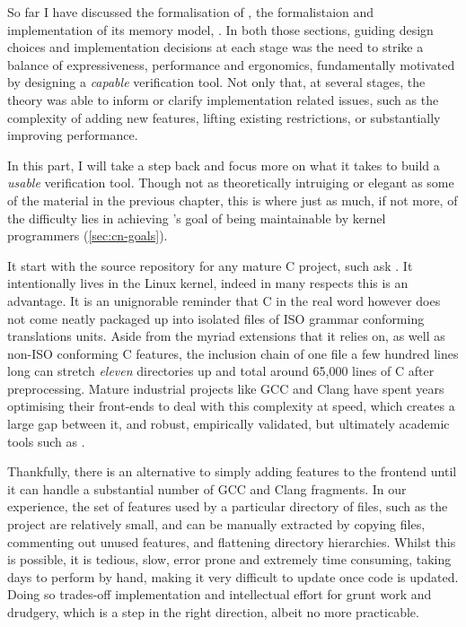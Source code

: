 So far I have discussed the formalisation of , the formalistaion and
implementation of its memory model, . In both those sections,
guiding design choices and implementation decisions at each stage was the need
to strike a balance of expressiveness, performance and ergonomics,
fundamentally motivated by designing a \emph{capable} verification tool. Not
only that, at several stages, the theory was able to inform or clarify
implementation related issues, such as the complexity of adding new features,
lifting existing restrictions, or substantially improving performance.

In this part, I will take a step back and focus more on what it takes to build
a \emph{usable} verification tool. Though not as theoretically intruiging or
elegant as some of the material in the previous chapter, this is where just as
much, if not more, of the difficulty lies in achieving 's goal of being
maintainable by kernel programmers (\cref{sec:cn-goals}).

It start with the source repository for any mature C project, such ask
. It intentionally lives in the Linux kernel, indeed in many respects
this is an advantage. It is an unignorable reminder that C in the real word
however does not come neatly packaged up into isolated files of ISO grammar
conforming translations units. Aside from the myriad extensions that it relies
on, as well as non-ISO conforming C features, the inclusion chain of one file a
few hundred lines long can stretch \emph{eleven} directories up and total
around 65,000 lines of C after preprocessing. Mature industrial projects like
GCC and Clang have spent years optimising their front-ends to deal with this
complexity at speed, which creates a large gap between it, and robust,
empirically validated, but ultimately academic tools such as .

Thankfully, there is an alternative to simply adding features to the
 frontend until it can handle a substantial number of GCC and
Clang fragments. In our experience, the set of features used by a particular
directory of files, such as the  project are relatively small, and can
be manually extracted by copying files, commenting out unused features, and
flattening directory hierarchies. Whilst this is possible, it is tedious, slow,
error prone and extremely time consuming, taking days to perform by hand,
making it very difficult to update once code is updated. Doing so trades-off
implementation and intellectual effort for grunt work and drudgery, which is a
step in the right direction, albeit no more practicable.

